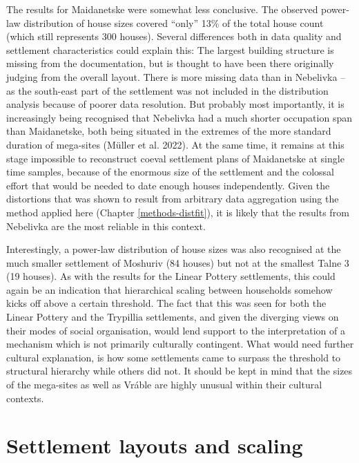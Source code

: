 \documentclass[
  12pt,
  a4paper, twoside]{book}
\begin{document}
The results for Maidanetske were somewhat less conclusive. The observed power-law distribution of house sizes covered ``only'' 13\% of the total house count (which still represents 300 houses). Several differences both in data quality and settlement characteristics could explain this: The largest building structure is missing from the documentation, but is thought to have been there originally judging from the overall layout. There is more missing data than in Nebelivka -- as the south-east part of the settlement was not included in the distribution analysis because of poorer data resolution. But probably most importantly, it is increasingly being recognised that Nebelivka had a much shorter occupation span than Maidanetske, both being situated in the extremes of the more standard duration of mega-sites (Müller et al. 2022). At the same time, it remains at this stage impossible to reconstruct coeval settlement plans of Maidanetske at single time samples, because of the enormous size of the settlement and the colossal effort that would be needed to date enough houses independently. Given the distortions that was shown to result from arbitrary data aggregation using the method applied here (Chapter \ref{methods-distfit}), it is likely that the results from Nebelivka are the most reliable in this context.

Interestingly, a power-law distribution of house sizes was also recognised at the much smaller settlement of Moshuriv (84 houses) but not at the smallest Talne 3 (19 houses). As with the results for the Linear Pottery settlements, this could again be an indication that hierarchical scaling between households somehow kicks off above a certain threshold. The fact that this was seen for both the Linear Pottery and the Trypillia settlements, and given the diverging views on their modes of social organisation, would lend support to the interpretation of a mechanism which is not primarily culturally contingent. What would need further cultural explanation, is how some settlements came to surpass the threshold to structural hierarchy while others did not. It should be kept in mind that the sizes of the mega-sites as well as Vráble are highly unusual within their cultural contexts.

\hypertarget{settlement-layouts-and-scaling}{%
\section{Settlement layouts and scaling}\label{settlement-layouts-and-scaling}}
\end{document}
